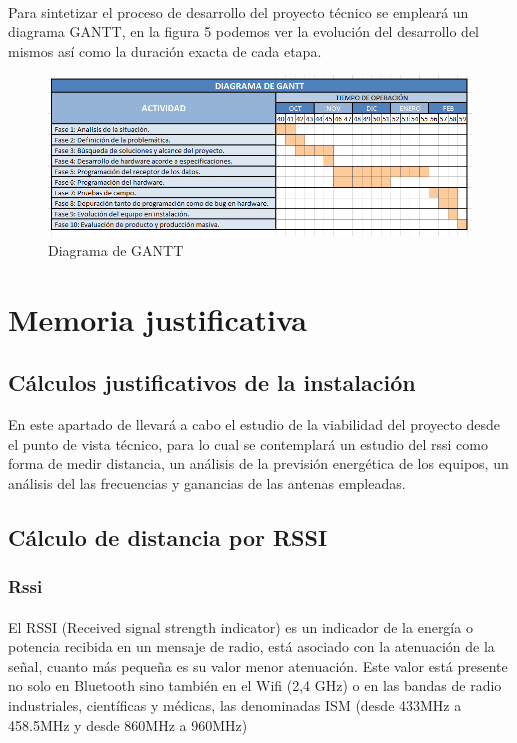 \documentclass[paper=a4, fontsize=11pt,twoside]{scrartcl}	%
\begin{document}
        \paragraph{}
        Para sintetizar el proceso de desarrollo del proyecto técnico se empleará un diagrama GANTT, en la
        figura 5 podemos ver la evolución del desarrollo del mismos así como la duración exacta de cada etapa. 
        \begin{center}
            \begin{figure}[ht]
                \centering
                \includegraphics[width=1\textwidth]{diagrama de gantt.PNG}
                \caption{Diagrama de GANTT}
                \label{fig:mesh18}
            \end{figure}
        \end{center} 
\section{Memoria justificativa}
    \subsection{Cálculos justificativos de la instalación}
        En este apartado de llevará a cabo el estudio de la viabilidad del proyecto desde el punto de vista
        técnico, para lo cual se contemplará un estudio del rssi como forma de medir distancia, un análisis 
        de la previsión energética de los equipos, un análisis del las frecuencias y ganancias de las antenas 
        empleadas.
    \subsection{Cálculo de distancia por RSSI}
        \subsubsection{Rssi}
            \paragraph{}
            El RSSI (Received signal strength indicator) es un indicador de la energía o potencia recibida en un mensaje de radio, 
            está asociado con la atenuación de la señal, cuanto más pequeña es su valor menor atenuación. Este valor está 
            presente no solo en Bluetooth sino también en el Wifi (2,4 GHz) o en las bandas de radio industriales, científicas y médicas,
            las denominadas ISM (desde 433MHz a 458.5MHz y desde 860MHz a 960MHz)
\end{document}

